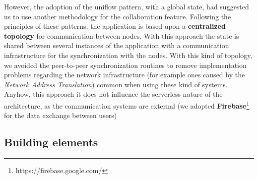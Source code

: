 However, the adoption of the uniflow pattern, with a global state, had suggested us to use another methodology for the collaboration feature. Following the principles of these patterns, the application is based upon a \textbf{centralized topology} for communication between nodes. With this approach the state is shared between several instances of the application with a communication infrastructure for the synchronization with the nodes. With this kind of topology, we avoided the peer-to-peer synchronization routines to remove implementation problems regarding the network infrastructure (for example ones caused by the \textit{Network Address Translation}) common when using these kind of systems. Anyhow, this approach it does not influence the serverless nature of the architecture, as the communication systems are external (we adopted \textbf{Firebase}\footnote{https://firebase.google.com/} for the data exchange between users)


\subsection{Building elements}\label{building_elements}



